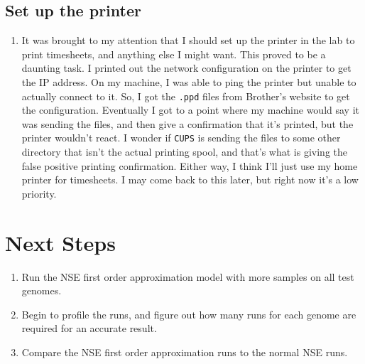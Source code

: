 \documentclass[12 pt]{article}
\begin{document}
 		\subsection{Set up the printer}
 		\begin{enumerate}
		 	\item It was brought to my attention that I should set up the printer in the lab to print timesheets, and anything else I might want. This proved to be a daunting task. I printed out the network configuration on the printer to get the IP address. On my machine, I was able to ping the printer but unable to actually connect to it. So, I got the \texttt{.ppd} files from Brother's website to get the configuration. Eventually I got to a point where my machine would say it was sending the files, and then give a confirmation that it's printed, but the printer wouldn't react. I wonder if \texttt{CUPS} is sending the files to some other directory that isn't the actual printing spool, and that's what is giving the false positive printing confirmation. Either way, I think I'll just use my home printer for timesheets. I may come back to this later, but right now it's a low priority.
 		\end{enumerate}
 		
 		\section{Next Steps}
	 		\begin{enumerate}
	 			\item Run the NSE first order approximation model with more samples on all test genomes.
	 			\item Begin to profile the runs, and figure out how many runs for each genome are required for an accurate result.
	 			\item Compare the NSE first order approximation runs to the normal NSE runs.
	 		\end{enumerate}
\end{document}
